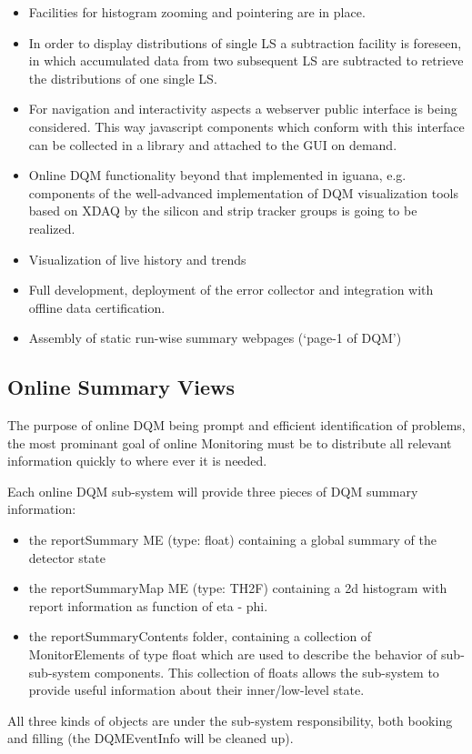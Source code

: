 \begin{itemize}
\begin{itemize}
\item Facilities for histogram zooming and pointering are in place.
\item In order to display distributions of single LS a subtraction facility is foreseen, in which accumulated data from two subsequent LS are subtracted to retrieve the distributions of one single LS.
\item For navigation and interactivity aspects a webserver public interface is being considered. This way javascript components which conform with this interface can be collected in a library and attached to the GUI on demand.
\item Online DQM functionality beyond that implemented in iguana, e.g.\,components of the well-advanced implementation of DQM visualization tools based on XDAQ by the silicon and strip tracker groups is going to be realized. 
\item Visualization of live history and trends %
\item Full development, deployment of the error collector
and integration with offline data certification.
\item Assembly of static run-wise summary webpages (`page-1 of DQM')
\end{itemize}
\end{itemize}

\subsection{Online Summary Views}
\label{sec:summary}

The purpose of online DQM being prompt and efficient identification of problems, the most prominant goal of online Monitoring must be to distribute all relevant information quickly to where ever it is needed.

Each online DQM sub-system will provide three pieces of DQM summary information:
\begin{itemize}
\item the reportSummary ME (type: float) containing a global summary of the detector state
\item the reportSummaryMap ME (type: TH2F) containing a 2d histogram with report information as function of eta - phi.
\item the reportSummaryContents folder, containing a collection of MonitorElements of type float which are used to describe the behavior of sub-sub-system components. This collection of floats allows the sub-system to provide useful information about their inner/low-level state.
\end{itemize}
All three kinds of objects are under the sub-system responsibility, both booking and filling (the DQMEventInfo will be cleaned up).

